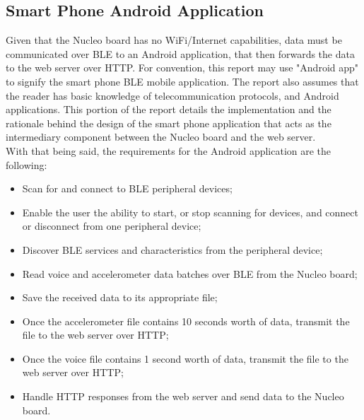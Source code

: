 \subsection{Smart Phone Android Application}
Given that the Nucleo board has no WiFi/Internet capabilities, data must be communicated over BLE to an Android application, that then forwards the data to the web server over HTTP. For convention, this report may use "Android app" to signify the smart phone BLE mobile application. The report also assumes that the reader has basic knowledge of telecommunication protocols, and Android applications. This portion of the report details the implementation and the rationale behind the design of the smart phone application that acts as the intermediary component between the Nucleo board and the web server.\\
With that being said, the requirements for the Android application are the following:

\begin{itemize}
    \item Scan for and connect to BLE peripheral devices;
    \item Enable the user the ability to start, or stop scanning for devices, and connect or disconnect from one peripheral device;
    \item Discover BLE services and characteristics from the peripheral device;
    \item Read voice and accelerometer data batches over BLE from the Nucleo board;
    \item Save the received data to its appropriate file;
    \item Once the accelerometer file contains 10 seconds worth of data, transmit the file to the web server over HTTP;
    \item Once the voice file contains 1 second worth of data, transmit the file to the web server over HTTP;
    \item Handle HTTP responses from the web server and send data to the Nucleo board.
\end{itemize}

